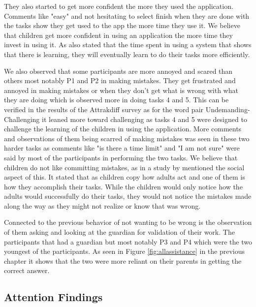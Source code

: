 They also started to get more confident the more they used the application. Comments like "easy" and not hesitating to select finish when they are done with the tasks show they get used to the app the more time they use it. We believe that children get more confident in using an application the more time they invest in using it. As  also stated that the time spent in using a system that shows that there is learning, they will eventually learn to do their tasks more efficiently.

We also observed that some participants are more annoyed and scared than others most notably P1 and P2 in making mistakes. They get frustrated and annoyed in making mistakes or when they don't get what is wrong with what they are doing which is observed more in doing tasks 4 and 5. This can be verified in the results of the Attrakdiff survey as for the word pair Undemanding-Challenging it leaned more toward challenging as tasks 4 and 5 were designed to challenge the learning of the children in using the application. More comments and observations of them being scarred of making mistakes was seen in these two harder tasks as comments like "is there a time limit" and "I am not sure" were said by most of the participants in performing the two tasks. We believe that children do not like committing mistakes, as in a study by \cite{hourcade2015child} mentioned the social aspect of this. It stated that as children copy how adults act and one of them is how they accomplish their tasks. While the children would only notice how the adults would successfully do their tasks, they would not notice the mistakes made along the way as they might not realize or know that was wrong. 

Connected to the previous behavior of not wanting to be wrong is the observation of them asking and looking at the guardian for validation of their work. The participants that had a guardian but most notably P3 and P4 which were the two youngest of the participants. As seen in Figure \ref{fig:allassistance} in the previous chapter it shows that the two were more reliant on their parents in getting the correct answer.

\subsection{Attention Findings}

